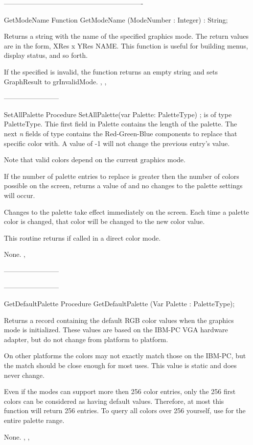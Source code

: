 -------------------------------------------------------------
\begin{function}{GetModeName}
\Declaration
Function GetModeName (ModeNumber : Integer) : String;

\Description

Returns a string with the name of the specified graphics mode. The
return values are in the form, XRes x YRes NAME. This function is
useful for building menus, display status, and so forth.

\Errors
If the specified  is invalid, the function returns an
empty string and sets GraphResult to grInvalidMode.
\SeeAlso
{}, , 
\end{function}
------------------------
\begin{procedure}{SetAllPalette}
\Declaration
Procedure SetAllPalette(var Palette: PaletteType) ;
\Description
{} is of type PaletteType. Thie first field in Palette
contains the length of the palette. The next \textit{n} fields of
type  contains the Red-Green-Blue components to replace
that specific color with. A value of -1 will not change the previous
entry's value.

Note that valid colors depend on the current graphics mode.

If the number of palette entries to replace is greater then the
number of colors possible on the screen,  returns
a value of  and no changes to the palette settings will
occur.

Changes to the palette take effect immediately on the screen. Each time
a palette color is changed, that color will be changed to the new color
value.

This routine returns  if called in a direct color mode.

\Errors
None.
\SeeAlso
{}, 
\end{procedure}
------------------------

------------------------
\begin{procedure}{GetDefaultPalette}
\Declaration
Procedure GetDefaultPalette (Var Palette : PaletteType);

\Description
Returns a  record containing the default RGB color
values when the graphics mode is initialized. These values are based
on the IBM-PC VGA hardware adapter, but do not change from platform
to platform.

On other platforms the colors may not exactly match those
on the IBM-PC, but the match should be close enough for most uses. This
value is static and does never change.

Even if the modes can support more then 256 color entries, only the
256 first colors can be considered as having default values. Therefore,
at most this function will return 256 entries. To query all colors over
256 yourself, use  for the entire palette range.

\Errors
None.
\SeeAlso
{}, , 
\end{procedure}


